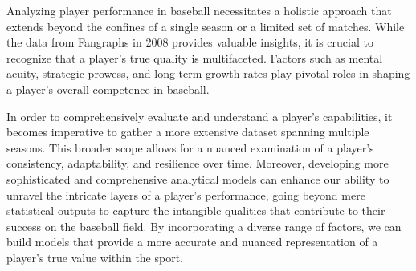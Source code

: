 \documentclass[12pt]{article}
\begin{document}
Analyzing player performance in baseball necessitates a holistic approach that extends beyond 
the confines of a single season or a limited set of matches. While the data from Fangraphs in 2008 provides 
valuable insights, it is crucial to recognize that a player's true quality is multifaceted. Factors such as mental
acuity, strategic prowess, and long-term growth rates play pivotal roles in shaping a player's overall 
competence in baseball.

In order to comprehensively evaluate and understand a player's capabilities, it becomes imperative 
to gather a more extensive dataset spanning multiple seasons. This broader scope allows for a nuanced 
examination of a player's consistency, adaptability, and resilience over time. Moreover, developing more 
sophisticated and comprehensive analytical models can enhance our ability to unravel the intricate layers of 
a player's performance, going beyond mere statistical outputs to capture the intangible qualities that contribute
to their success on the baseball field. By incorporating a diverse range of factors, we can build models 
that provide a more accurate and nuanced representation of a player's true value within the sport.




\end{document}
